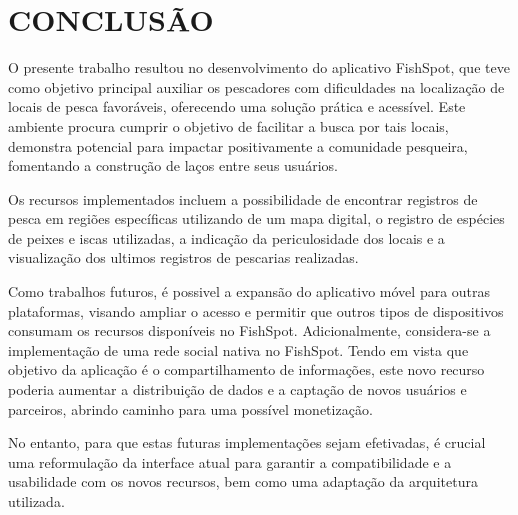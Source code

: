 
\chapter{CONCLUSÃO}
\label{chap:conclusao}

O presente trabalho resultou no desenvolvimento do aplicativo FishSpot, que teve como objetivo principal auxiliar os pescadores com dificuldades na localização de locais de pesca favoráveis, oferecendo uma solução prática e acessível. Este ambiente procura cumprir o objetivo de facilitar a busca por tais locais, demonstra potencial para impactar positivamente a comunidade pesqueira, fomentando a construção de laços entre seus usuários. 

Os recursos implementados incluem a possibilidade de encontrar registros de pesca em regiões específicas utilizando de um mapa digital, o registro de espécies de peixes e iscas utilizadas, a indicação da periculosidade dos locais e a visualização dos ultimos registros de pescarias realizadas.

Como trabalhos futuros, é possivel a expansão do aplicativo móvel para outras plataformas, visando ampliar o acesso e permitir que outros tipos de dispositivos consumam os recursos disponíveis no FishSpot. Adicionalmente, considera-se a implementação de uma rede social nativa no FishSpot. Tendo em vista que objetivo da aplicação é o compartilhamento de informações, este novo recurso poderia aumentar a distribuição de dados e a captação de novos usuários e parceiros, abrindo caminho para uma possível monetização. 

No entanto, para que estas futuras implementações sejam efetivadas, é crucial uma reformulação da interface atual para garantir a compatibilidade e a usabilidade com os novos recursos, bem como uma adaptação da arquitetura utilizada.
